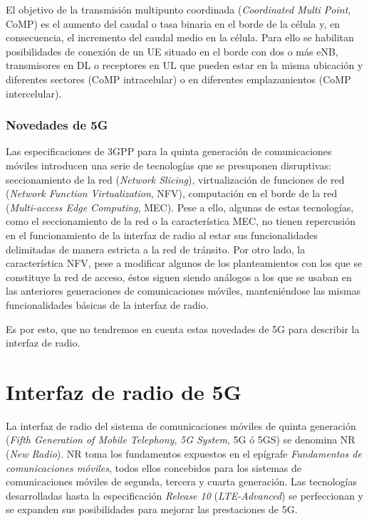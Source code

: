 \documentclass[12pt]{report} %
\begin{document}
El objetivo de la transmisión multipunto coordinada (\textit{Coordinated Multi Point}, CoMP) es el aumento del caudal o tasa binaria en el borde de la célula y, en consecuencia, el incremento del caudal medio en la célula.
Para ello se habilitan posibilidades de conexión de un UE situado en el borde con dos o más eNB, transmisores en DL o receptores en UL que pueden estar en la misma ubicación y diferentes sectores (CoMP intracelular) o en diferentes emplazamientos (CoMP intercelular).
\cite{RefWorks:81, RefWorks:39, RefWorks:26}

\subsubsection{Novedades de 5G}

Las especificaciones de 3GPP para la quinta generación de comunicaciones móviles introducen una serie de tecnologías que se presuponen disruptivas:
seccionamiento de la red (\textit{Network Slicing}), virtualización de funciones de red (\textit{Network Function Virtualization}, NFV), computación en el borde de la red (\textit{Multi-access Edge Computing}, MEC).
Pese a ello, algunas de estas tecnologías, como el seccionamiento de la red o la característica MEC, no tienen repercusión en el funcionamiento de la interfaz de radio al estar sus funcionalidades delimitadas de manera estricta a la red de tránsito.
Por otro lado, la característica NFV, pese a modificar algunos de los planteamientos con los que se constituye la red de acceso, éstos siguen siendo análogos a los que se usaban en las anteriores generaciones de comunicaciones móviles, manteniéndose las mismas funcionalidades básicas de la interfaz de radio.
\cite{RefWorks:47}

Es por esto, que no tendremos en cuenta estas novedades de 5G para describir la interfaz de radio.

\section{Interfaz de radio de 5G}

La interfaz de radio del sistema de comunicaciones móviles de quinta generación (\textit{Fifth Generation of Mobile Telephony}, \textit{5G System}, 5G ó 5GS) se denomina NR (\textit{New Radio}).
NR toma los fundamentos expuestos en el epígrafe \textit{Fundamentos de comunicaciones móviles},
todos ellos concebidos para los sistemas de comunicaciones móviles de segunda, tercera y cuarta generación.
Las tecnologías desarrolladas hasta la especificación \textit{Release 10} (\textit{LTE-Advanced}) se perfeccionan y se expanden sus posibilidades para mejorar las prestaciones de 5G.
\end{document}
